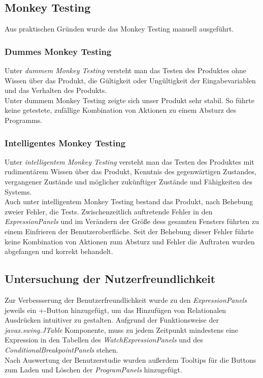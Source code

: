 \documentclass[parskip=full]{scrartcl}
\begin{document}
\subsection{Monkey Testing}
Aus praktischen Gründen wurde das Monkey Testing manuell ausgeführt.
\subsubsection{Dummes Monkey Testing}
Unter \textit{dummem Monkey Testing} versteht man das Testen des Produktes ohne Wissen über das Produkt, die Gültigkeit oder Ungültigkeit der Eingabevariablen und  das Verhalten des Produkts. \\
Unter dummem Monkey Testing zeigte sich unser Produkt sehr stabil. So führte keine getestete, zufällige Kombination von Aktionen zu einem Absturz des Programms. 
\subsubsection{Intelligentes Monkey Testing}
Unter \textit{intelligentem Monkey Testing} versteht man das Testen des Produktes mit rudimentärem Wissen über das Produkt, Kenntnis des gegenwärtigen Zustandes, vergangener Zustände und  möglicher zukünftiger Zustände und Fähigkeiten des Systems. \\
Auch unter intelligentem Monkey Testing bestand das Produkt, nach Behebung zweier Fehler, die Tests. Zwischenzeitlich auftretende Fehler in den \textit{ExpressionPanels} und im Verändern der Größe dess gesamten Fensters führten zu einem Einfrieren der Benutzeroberfläche. Seit der Behebung dieser Fehler führte keine Kombination von Aktionen zum Absturz und Fehler die Auftraten wurden abgefangen und korrekt behandelt.

\subsection{Untersuchung der Nutzerfreundlichkeit}
Zur Verbessserung der Benutzerfreundlichkeit wurde zu den \textit{ExpressionPanels} jeweils ein +-Button hinzugefügt, um das Hinzufügen von Relationalen Ausdrücken intuitiver zu gestalten. Aufgrund der Funktionsweise der \textit{javax.swing.JTable} Komponente, muss zu jedem Zeitpunkt mindestens eine Expression in den Tabellen des \textit{WatchExpressionPanels} und des \textit{ConditionalBreakpointPanels} stehen. \\
Nach Auswertung der Benutzerstudie wurden außerdem Tooltips für die Buttons zum Laden und Löschen der \textit{ProgramPanels} hinzugefügt.
\end{document}
